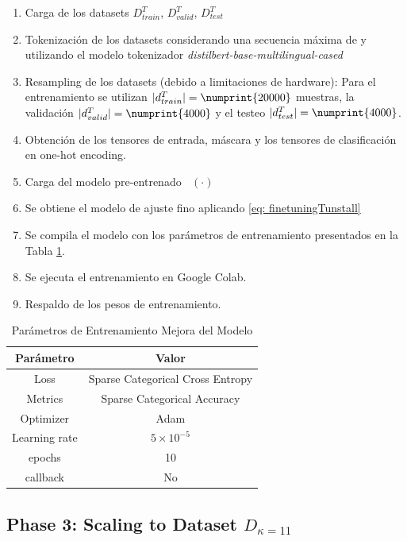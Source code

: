 \documentclass[onecolumn, journal, english, 12pt, a4paper]{IEEEtran} %
\DeclareMathOperator{\ypredsource}{\phi^{S}}
\theoremstyle{definition}
\begin{document}
\begin{enumerate}
    \item Carga de los datasets $D^T_{train}$, $D^T_{valid}$, $D^T_{test}$
    \item Tokenización de los datasets considerando una secuencia
      máxima de  y utilizando el modelo tokenizador
      \emph{distilbert-base-multilingual-cased}
    \item Resampling de los datasets (debido a limitaciones de hardware): Para el entrenamiento se utilizan $|d_{train}^T| = \numprint{20000}$ muestras, la validación $|d_{valid}^T| = \numprint{4000}$ y el testeo $|d_{test}^T| = \numprint{4000}$.
    \item Obtención de los tensores de entrada, máscara y los tensores
      de clasificación en one-hot encoding.
    \item Carga del modelo pre-entrenado $\ypredsource(\cdot)$
    \item Se obtiene el modelo de ajuste fino aplicando \eqref{eq:
        finetuningTunstall}
    \item Se compila el modelo con los parámetros de entrenamiento
      presentados en la Tabla \ref{tab:trainingParam2}.
    \item Se ejecuta el entrenamiento en Google Colab.
    \item Respaldo de los pesos de entrenamiento.
\end{enumerate}

\begin{table}
    \caption{Parámetros de Entrenamiento Mejora del Modelo}
    \label{tab:trainingParam2}
    \centering
    \begin{tabular}{cc}
    \hline
    Parámetro & Valor\\
    \hline
     Loss & Sparse Categorical Cross Entropy\\
    Metrics & Sparse Categorical Accuracy \\
    Optimizer & Adam \\
    Learning rate & $5 \times 10^{-5}$ \\
    epochs & 10 \\
    callback & No \\
    \hline
    \end{tabular}
  \end{table}

  
\subsection{Phase 3: Scaling to Dataset $D_{\kappa=11}$}
\label{sec:phase-3:-scaling-fullmodel}
\end{document}
